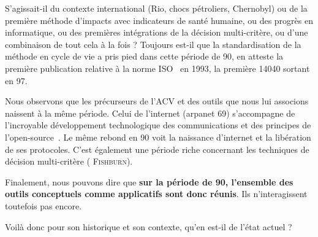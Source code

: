 {S'agissait-il du contexte international (Rio, chocs pétroliers, Chernobyl)
ou de la première méthode d'impacts avec indicateurs de santé humaine,
ou des progrès en informatique,
ou des premières intégrations de la décision multi-critère,
ou d'une combinaison de tout cela à la fois ?
Toujours est-il que la standardisation de la méthode en cycle de vie a pris pied dans cette période de 90, en atteste la première publication relative à la norme ISO~\cite[ISO - Technical committees - ISO/TC 207/SC 5 - Life cycle assessment.]{iso_iso_1993} en 1993, la première 14040 sortant en 97.%

Nous observons que les précurseurs de l'ACV et des outils que nous lui associons naissent à la même période.
Celui de l'internet (arpanet 69) s'accompagne de l'incroyable développement technologique des communications et des principes de l'open-source~\cite{raymond_cathedral_2001}.
Le même rebond en 90 voit la naissance d'internet et la libération de ses protocoles.
C'est également une période riche concernant les techniques de décision multi-critère (\citeauthor{roy_classement_1968} \textsc{Fishburn}).

Finalement, nous pouvons dire que \textbf{sur la période de 90, l'ensemble des outils conceptuels comme applicatifs sont donc réunis}.
Ils n'interagissent toutefois pas encore.
}

Voilà donc pour son historique et son contexte, qu'en est-il de l'état actuel ?

